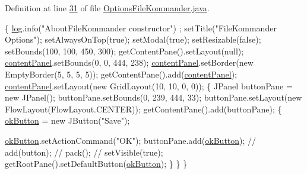 Definition at line \hyperlink{L31}{31} of file \hyperlink{}{Options\-File\-Kommander.\-java}.


\begin{DoxyCode}
                                  \{
        \hyperlink{classcom_1_1poly_1_1nlp_1_1filekommander_1_1views_1_1_options_file_kommander_aaf488bac9983e9c54d0470f623d038a9}{log}.info(\textcolor{stringliteral}{"AboutFileKommander constructor"}) ;
        setTitle(\textcolor{stringliteral}{"FileKommander Options"});
        setAlwaysOnTop(\textcolor{keyword}{true});
        setModal(\textcolor{keyword}{true});
        setResizable(\textcolor{keyword}{false});
        setBounds(100, 100, 450, 300);
        getContentPane().setLayout(null);
        \hyperlink{classcom_1_1poly_1_1nlp_1_1filekommander_1_1views_1_1_options_file_kommander_a566cf729d42553b326dc4eaaf52cd9d8}{contentPanel}.setBounds(0, 0, 444, 238);
        \hyperlink{classcom_1_1poly_1_1nlp_1_1filekommander_1_1views_1_1_options_file_kommander_a566cf729d42553b326dc4eaaf52cd9d8}{contentPanel}.setBorder(\textcolor{keyword}{new} EmptyBorder(5, 5, 5, 5));
        getContentPane().add(\hyperlink{classcom_1_1poly_1_1nlp_1_1filekommander_1_1views_1_1_options_file_kommander_a566cf729d42553b326dc4eaaf52cd9d8}{contentPanel});
        \hyperlink{classcom_1_1poly_1_1nlp_1_1filekommander_1_1views_1_1_options_file_kommander_a566cf729d42553b326dc4eaaf52cd9d8}{contentPanel}.setLayout(\textcolor{keyword}{new} GridLayout(10, 10, 0, 0));
        \{
            JPanel buttonPane = \textcolor{keyword}{new} JPanel();
            buttonPane.setBounds(0, 239, 444, 33);
            buttonPane.setLayout(\textcolor{keyword}{new} FlowLayout(FlowLayout.CENTER));
            getContentPane().add(buttonPane);
            \{
                \hyperlink{classcom_1_1poly_1_1nlp_1_1filekommander_1_1views_1_1_options_file_kommander_a0f8aef931bc85b51505210be4fbc87e1}{okButton} = \textcolor{keyword}{new} JButton(\textcolor{stringliteral}{"Save"});
                
                \hyperlink{classcom_1_1poly_1_1nlp_1_1filekommander_1_1views_1_1_options_file_kommander_a0f8aef931bc85b51505210be4fbc87e1}{okButton}.setActionCommand(\textcolor{stringliteral}{"OK"});
                buttonPane.add(\hyperlink{classcom_1_1poly_1_1nlp_1_1filekommander_1_1views_1_1_options_file_kommander_a0f8aef931bc85b51505210be4fbc87e1}{okButton});
                \textcolor{comment}{// add(button);}
                \textcolor{comment}{// pack();}
                \textcolor{comment}{// setVisible(true);}
                getRootPane().setDefaultButton(\hyperlink{classcom_1_1poly_1_1nlp_1_1filekommander_1_1views_1_1_options_file_kommander_a0f8aef931bc85b51505210be4fbc87e1}{okButton});
            \}
        \}
    \}
\end{DoxyCode}


